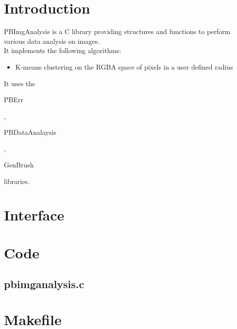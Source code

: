\section*{Introduction}

PBImgAnalysis is a C library providing structures and functions to perform various data analysis on images.\\ 

It implements the following algorithms:
\begin{itemize}
\item K-means clustering on the RGBA space of pixels in a user defined radius
\end{itemize}

It uses the \begin{ttfamily}PBErr\end{ttfamily}, \begin{ttfamily}PBDataAnalaysis\end{ttfamily}, \begin{ttfamily}GenBrush\end{ttfamily} libraries.\\

\section{Interface}

\begin{scriptsize}
\begin{ttfamily}

\end{ttfamily}
\end{scriptsize}

\section{Code}

\subsection{pbimganalysis.c}

\begin{scriptsize}
\begin{ttfamily}

\end{ttfamily}
\end{scriptsize}

\section{Makefile}

